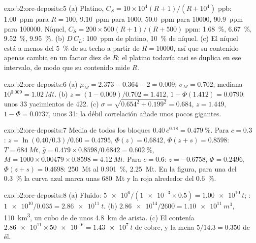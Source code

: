 \begin{solution}{exo:b2:ore-deposits:5}
(a) Platino, $C_S = 10 \times 10^4 (R + 1)/(R + 10^4)$ ppb: \qty{1.00}{ppm} para $R = 100$,
\qty{9.10}{ppm} para \num{1000}, \qty{50.0}{ppm} para \num{10000}, \qty{90.9}{ppm} para \num{100000}.
Níquel, $C_S = 200 \times 500 (R + 1)/(R + 500)$ ppm: \qty{1.68}{\percent}, \qty{6.67}{\percent},
\qty{9.52}{\percent}, \qty{9.95}{\percent}. (b) $D\,C_L$: \qty{100}{ppm} de platino,
\qty{10}{\percent} de níquel. (c) El níquel está a menos del \qty{5}{\percent} de su techo a partir de
$R = \num{10000}$, así que su contenido apenas cambia en un factor diez de $R$; el platino todavía
casi se duplica en ese intervalo, de modo que su contenido mide $R$.
\end{solution}

\begin{solution}{exo:b2:ore-deposits:6}
(a) $\mu_M = 2.373 - 0.364 - 2 = 0.009$; $\sigma_M = 0.702$; mediana $10^{0.009} = \qty{1.02}{Mt}$.
(b) $z = (1 - 0.009)/0.702 = 1.412$, $1 - \Phi(1.412) = 0.0790$: unos 33 yacimientos de 422.
(c) $\sigma = \sqrt{0.654^2 + 0.199^2} = 0.684$, $z = 1.449$, $1 - \Phi = 0.0737$, unos 31: la
débil correlación añade unos pocos gigantes.
\end{solution}

\begin{solution}{exo:b2:ore-deposits:7}
Media de todos los bloques $0.40\,e^{0.18} = \qty{0.479}{\percent}$. Para $c = 0.3$: $z = \ln(0.40/0.3)/0.60 =
0.4795$, $\Phi(z) = 0.6842$, $\Phi(z + s) = 0.8598$: $T = \qty{684}{Mt}$, $\bar g = 0.479 \times
0.8598/0.6842 = \qty{0.602}{\percent}$, $M = 1000 \times 0.00479 \times 0.8598 = \qty{4.12}{Mt}$.
Para $c = 0.6$: $z = -0.6758$, $\Phi = 0.2496$, $\Phi(z + s) = 0.4698$: \qty{250}{Mt} al
\qty{0.901}{\percent}, \qty{2.25}{Mt}. En la figura, para una  del \qty{0.3}{\percent} la curva azul
marca unas \qty{680}{Mt} y la roja alrededor del \qty{0.6}{\percent}.
\end{solution}

\begin{solution}{exo:b2:ore-deposits:8}
(a) Fluido: $\num{5e6}/(\num{1e-3} \times 0.5) = \qty{1.00e10}{t}$; : $\num{1e10}/0.035 =
\qty{2.86e11}{t}$. (b) $\num{2.86e14}/2600 = \qty{1.10e11}{m^3}$, \qty{110}{km^3}, un cubo de 
de unos \qty{4.8}{km} de arista. (c) El  contenía $\num{2.86e11}
\times \num{50e-6} = \qty{1.43e7}{t}$ de cobre, y la mena $5/14.3 = 0.350$ de él.
\end{solution}

